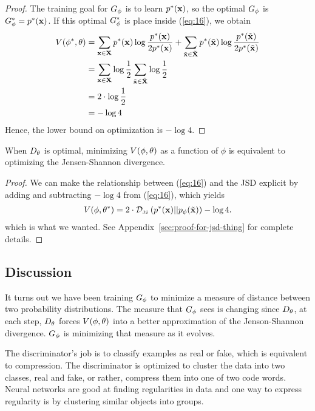 \begin{proof}
  The training goal for $G_\phi$ is to learn $p^*(\mathbf{x})$, so the optimal $G_\phi$ is $G_\phi^* =
  p^*(\mathbf{x})$. If this optimal $G_\phi^*$ is place inside (\ref{eq:16}), we obtain
  \begin{align}
    \label{eq:side-note}
    V(\phi^*, \theta) & = \sum_{\mathbf{x} \in \mathbf{X}}p^*(\mathbf{x}) \log{ p^*(\mathbf{x})\over 2 p^*(\mathbf{x})} + \sum_{\tilde{\mathbf{x}} \in \tilde{\mathbf{X}}}p^*(\tilde{\mathbf{x}}) \log{ p^*(\tilde{\mathbf{x}}) \over 2 p^*(\tilde{\mathbf{x}})} \\
                      & = \sum_{\mathbf{x} \in \mathbf{X}} \log {1 \over 2} \sum_{\tilde{\mathbf{x}} \in \tilde{\mathbf{X}}} \log {1 \over 2} \\
                      & = 2 \cdot \log{1 \over 2} \\
                      & = -\log{4}
  \end{align}
  Hence, the lower bound on optimization is $-\log{4}$.
\end{proof}

\begin{theorem}
  When $D_\theta$ is optimal, minimizing $V(\phi, \theta)$ as a function of $\phi$ is equivalent to
  optimizing the Jensen-Shannon divergence.
\end{theorem}

\begin{proof}
  We can make the relationship between (\ref{eq:16}) and the JSD explicit by
  adding and subtracting $-\log{4}$ from (\ref{eq:16}), which yields
  \begin{align}
    \label{eq:desired}
    V(\phi, \theta^*) = 2 \cdot \mathcal{D}_{\text{\tiny JS}}\left(p^*(\mathbf{x})\middle|\middle|p_{\phi}(\tilde{\mathbf{x}})\right) - \log{4}.
  \end{align}
  which is what we wanted. See Appendix~\ref{sec:proof-for-jsd-thing} for
  complete details.
\end{proof}

\subsection{Discussion}

It turns out we have been training $G_\phi$ to minimize a measure of
distance between two probability distributions. The measure that $G_\phi$
sees is changing since $D_\theta$, at each step, $D_\theta$ forces $V(\phi, \theta)$ into a
better approximation of the Jenson-Shannon divergence.  $G_\phi$ is
minimizing that measure as it evolves.

The discriminator's job is to classify examples as real or fake, which
is equivalent to compression. The discriminator is optimized to
cluster the data into two classes, real and fake, or rather, compress
them into one of two code words. Neural networks are good at finding
regularities in data and one way to express regularity is by
clustering similar objects into groups.

